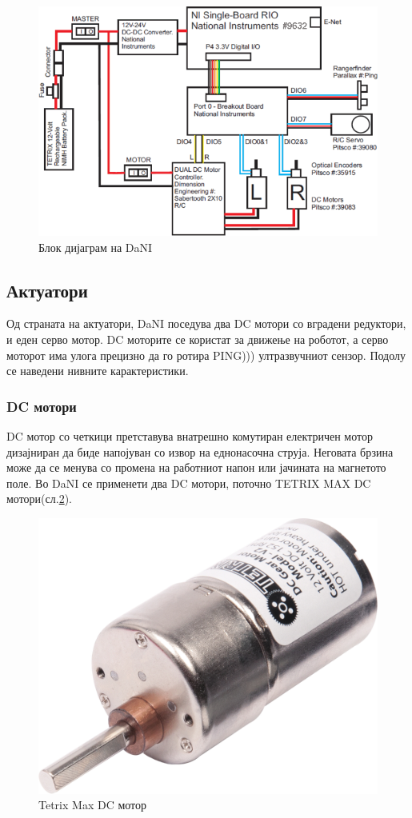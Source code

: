 \documentclass[12pt]{article}
\begin{document}
	\begin{figure}[H]
		\includegraphics[width=0.75\linewidth]{./images/dani_block_diagram.png}
		\centering
		\caption{Блок дијаграм на DaNI}
		\label{fig:dani_block_diagram.png}
		\end{figure}

	\subsection{Актуатори}
		Од страната на актуатори, DaNI поседува два DC мотори со вградени редуктори, и еден серво мотор. DC моторите се користат за движење на роботот, а серво моторот има улога прецизно да го ротира PING))) ултразвучниот сензор. Подолу се наведени нивните карактеристики.

	  \subsubsection{DC мотори}
		  DC мотор со четкици претставува внатрешно комутиран електричен мотор дизајниран да биде напојуван со извор на еднонасочна струја. Неговата брзина може да се менува со промена на работниот напон или јачината на магнетото поле.
		  Во DaNI се применети два DC мотори, поточно TETRIX MAX DC мотори(сл.\ref{fig:dc_motor_iso.png}).

		  \begin{figure}[H]
    	  \includegraphics[width=0.35\linewidth]{./images/dc_motor_iso.png}
			  \centering
			  \caption{Tetrix Max DC мотор}
			  \label{fig:dc_motor_iso.png}
			  \end{figure}
\end{document}
